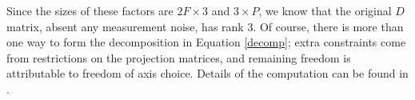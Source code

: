 Since the sizes of these factors are $2F \times 3$ and $3 \times P$, we know that the original $D$ matrix, absent any measurement noise, has rank 3.  Of course, there is more than one way to form the decomposition in Equation \ref{decomp}; extra constraints come from restrictions on the projection matrices, and remaining freedom is attributable to freedom of axis choice.  Details of the computation can be found in \cite{sfm}.